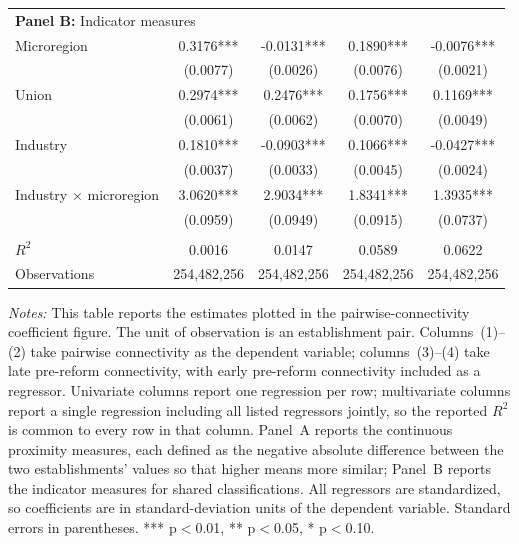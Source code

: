 \begin{table}[H]
\begin{tabular}{lcccc}
\multicolumn{5}{l}{\textbf{Panel B:} Indicator measures} \\
Microregion & 0.3176*** & -0.0131*** & 0.1890*** & -0.0076*** \\
 & (0.0077) & (0.0026) & (0.0076) & (0.0021) \\
Union & 0.2974*** & 0.2476*** & 0.1756*** & 0.1169*** \\
 & (0.0061) & (0.0062) & (0.0070) & (0.0049) \\
Industry & 0.1810*** & -0.0903*** & 0.1066*** & -0.0427*** \\
 & (0.0037) & (0.0033) & (0.0045) & (0.0024) \\
Industry $\times$ microregion & 3.0620*** & 2.9034*** & 1.8341*** & 1.3935*** \\
 & (0.0959) & (0.0949) & (0.0915) & (0.0737) \\
 &  &  &  & \\
\midrule
$R^2$ & 0.0016 & 0.0147 & 0.0589 & 0.0622 \\
Observations & 254{,}482{,}256 & 254{,}482{,}256 & 254{,}482{,}256 & 254{,}482{,}256 \\
\bottomrule\bottomrule
\end{tabular}
\begin{minipage}{\linewidth}
    \scriptsize\vspace{4pt}
    \textit{Notes:} This table reports the estimates plotted in the pairwise-connectivity coefficient figure. The unit of observation is an establishment pair. Columns~(1)--(2) take pairwise connectivity as the dependent variable; columns~(3)--(4) take late pre-reform connectivity, with early pre-reform connectivity included as a regressor. Univariate columns report one regression per row; multivariate columns report a single regression including all listed regressors jointly, so the reported $R^2$ is common to every row in that column. Panel~A reports the continuous proximity measures, each defined as the negative absolute difference between the two establishments' values so that higher means more similar; Panel~B reports the indicator measures for shared classifications. All regressors are standardized, so coefficients are in standard-deviation units of the dependent variable. Standard errors in parentheses. *** p$<$0.01, ** p$<$0.05, * p$<$0.10.
\end{minipage}
\end{table}
